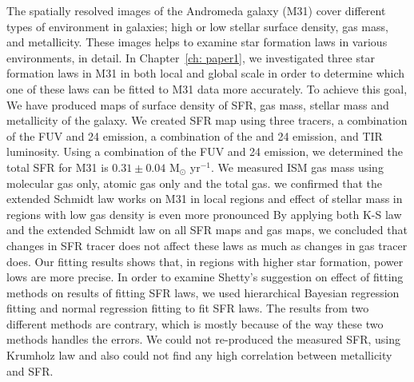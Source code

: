 The spatially resolved images of the Andromeda galaxy (M31) cover different types of environment in galaxies; high or low stellar surface density, gas mass, and metallicity.
These images helps to examine star formation laws in various environments, in detail.
In Chapter~\ref{ch: paper1}, we investigated three star formation laws in M31 in both local and global scale in order to determine which one of these laws can be fitted to M31 data more accurately.
To achieve this goal, We have produced maps of surface density of SFR, gas mass, stellar mass and metallicity of the galaxy.
We created SFR map using three tracers, a combination of the FUV and 24 \um emission, a combination of the \halpha and 24 \um emission, and TIR luminosity. 
Using a combination of the FUV and 24 \um emission, we determined the total SFR for M31 is $0.31\pm 0.04$ M$_\odot$ yr$^{−1}$.
We measured ISM gas mass using molecular gas only, atomic gas only and the total gas.
we confirmed that the extended Schmidt law works on M31 in local regions and effect of stellar mass in regions with low gas density is even more pronounced 
By applying both K-S law and the extended Schmidt law on all SFR maps and gas maps, we concluded that changes in SFR tracer does not affect these laws as much as changes in gas tracer does.
Our fitting results shows that, in regions with higher star formation, power lows are more precise.
In order to examine Shetty's suggestion on effect of fitting methods on results of fitting SFR laws, we used hierarchical Bayesian regression fitting and normal regression fitting to fit SFR laws.
The results from two different methods are contrary, which is mostly because of the way these two methods handles the errors.
We could not re-produced the measured SFR, using Krumholz law and also could not find any high correlation between metallicity and SFR.



